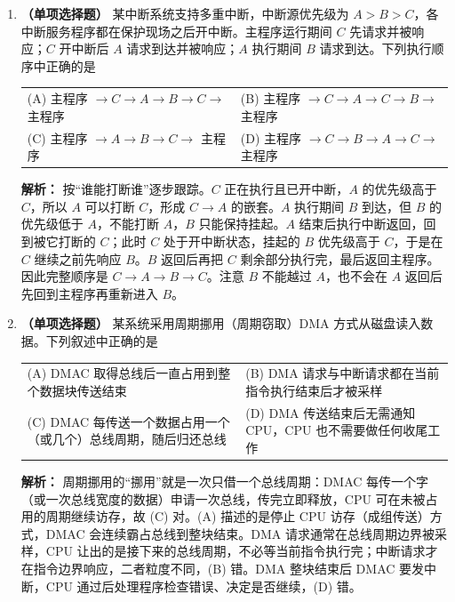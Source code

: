 \begin{enumerate}

\item \textbf{（单项选择题）} 某中断系统支持多重中断，中断源优先级为 $A>B>C$，各中断服务程序都在保护现场之后开中断。主程序运行期间 $C$ 先请求并被响应；$C$ 开中断后 $A$ 请求到达并被响应；$A$ 执行期间 $B$ 请求到达。下列执行顺序中正确的是
\begin{center}
\begin{tabularx}{0.96\linewidth}{@{}X X@{}}
(A) 主程序 $\to C\to A\to B\to C\to$ 主程序 & (B) 主程序 $\to C\to A\to C\to B\to$ 主程序 \\[4pt]
(C) 主程序 $\to A\to B\to C\to$ 主程序 & (D) 主程序 $\to C\to B\to A\to C\to$ 主程序
\end{tabularx}
\end{center}

\ifshowsolutions\par\noindent\textbf{解析：} 按“谁能打断谁”逐步跟踪。$C$ 正在执行且已开中断，$A$ 的优先级高于 $C$，所以 $A$ 可以打断 $C$，形成 $C\to A$ 的嵌套。$A$ 执行期间 $B$ 到达，但 $B$ 的优先级低于 $A$，不能打断 $A$，$B$ 只能保持挂起。$A$ 结束后执行中断返回，回到被它打断的 $C$；此时 $C$ 处于开中断状态，挂起的 $B$ 优先级高于 $C$，于是在 $C$ 继续之前先响应 $B$。$B$ 返回后再把 $C$ 剩余部分执行完，最后返回主程序。因此完整顺序是 $C\to A\to B\to C$。注意 $B$ 不能越过 $A$，也不会在 $A$ 返回后先回到主程序再重新进入 $B$。\else \answerarea \fi

\item \textbf{（单项选择题）} 某系统采用周期挪用（周期窃取）DMA 方式从磁盘读入数据。下列叙述中正确的是
\begin{center}
\begin{tabularx}{0.96\linewidth}{@{}X X@{}}
(A) DMAC 取得总线后一直占用到整个数据块传送结束 & (B) DMA 请求与中断请求都在当前指令执行结束后才被采样 \\[4pt]
(C) DMAC 每传送一个数据占用一个（或几个）总线周期，随后归还总线 & (D) DMA 传送结束后无需通知 CPU，CPU 也不需要做任何收尾工作
\end{tabularx}
\end{center}

\ifshowsolutions\par\noindent\textbf{解析：} 周期挪用的“挪用”就是一次只借一个总线周期：DMAC 每传一个字（或一次总线宽度的数据）申请一次总线，传完立即释放，CPU 可在未被占用的周期继续访存，故 (C) 对。(A) 描述的是停止 CPU 访存（成组传送）方式，DMAC 会连续霸占总线到整块结束。DMA 请求通常在总线周期边界被采样，CPU 让出的是接下来的总线周期，不必等当前指令执行完；中断请求才在指令边界响应，二者粒度不同，(B) 错。DMA 整块结束后 DMAC 要发中断，CPU 通过后处理程序检查错误、决定是否继续，(D) 错。\else \answerarea \fi


\end{enumerate}
